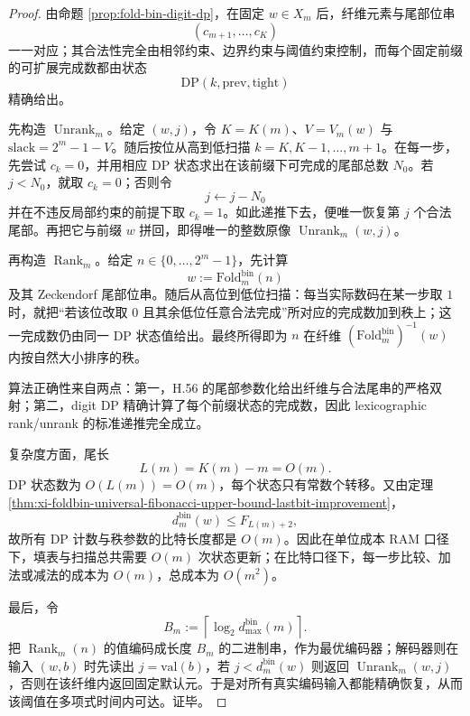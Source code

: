 \begin{proof}
由命题 \ref{prop:fold-bin-digit-dp}，在固定 \(w\in X_m\) 后，纤维元素与尾部位串
\[
(c_{m+1},\dots,c_K)
\]
一一对应；其合法性完全由相邻约束、边界约束与阈值约束控制，而每个固定前缀的可扩展完成数都由状态
\[
\mathrm{DP}(k,\mathrm{prev},\mathrm{tight})
\]
精确给出。

先构造 \(\operatorname{Unrank}_m\)。给定 \((w,j)\)，令 \(K=K(m)\)、\(V=V_m(w)\) 与 \(\mathrm{slack}=2^m-1-V\)。随后按位从高到低扫描 \(k=K,K-1,\dots,m+1\)。在每一步，先尝试 \(c_k=0\)，并用相应 DP 状态求出在该前缀下可完成的尾部总数 \(N_0\)。若 \(j<N_0\)，就取 \(c_k=0\)；否则令
\[
j\leftarrow j-N_0
\]
并在不违反局部约束的前提下取 \(c_k=1\)。如此递推下去，便唯一恢复第 \(j\) 个合法尾部。再把它与前缀 \(w\) 拼回，即得唯一的整数原像 \(\operatorname{Unrank}_m(w,j)\)。

再构造 \(\operatorname{Rank}_m\)。给定 \(n\in\{0,\dots,2^m-1\}\)，先计算
\[
w:=\mathrm{Fold}^{\mathrm{bin}}_m(n)
\]
及其 Zeckendorf 尾部位串。随后从高位到低位扫描：每当实际数码在某一步取 \(1\) 时，就把“若该位改取 \(0\) 且其余低位任意合法完成”所对应的完成数加到秩上；这一完成数仍由同一 DP 状态值给出。最终所得即为 \(n\) 在纤维 \((\mathrm{Fold}^{\mathrm{bin}}_m)^{-1}(w)\) 内按自然大小排序的秩。

算法正确性来自两点：第一，H.56 的尾部参数化给出纤维与合法尾串的严格双射；第二，digit DP 精确计算了每个前缀状态的完成数，因此 lexicographic rank/unrank 的标准递推完全成立。

复杂度方面，尾长
\[
L(m)=K(m)-m=O(m).
\]
DP 状态数为 \(O(L(m))=O(m)\)，每个状态只有常数个转移。又由定理 \ref{thm:xi-foldbin-universal-fibonacci-upper-bound-lastbit-improvement}，
\[
d_m^{\mathrm{bin}}(w)\le F_{L(m)+2},
\]
故所有 DP 计数与秩参数的比特长度都是 \(O(m)\)。因此在单位成本 RAM 口径下，填表与扫描总共需要 \(O(m)\) 次状态更新；在比特口径下，每一步比较、加法或减法的成本为 \(O(m)\)，总成本为 \(O(m^2)\)。

最后，令
\[
B_m:=\left\lceil \log_2 d_{\max}^{\mathrm{bin}}(m)\right\rceil.
\]
把 \(\operatorname{Rank}_m(n)\) 的值编码成长度 \(B_m\) 的二进制串，作为最优编码器；解码器则在输入 \((w,b)\) 时先读出 \(j=\mathrm{val}(b)\)，若 \(j<d_m^{\mathrm{bin}}(w)\) 则返回 \(\operatorname{Unrank}_m(w,j)\)，否则在该纤维内返回固定默认元。于是对所有真实编码输入都能精确恢复，从而该阈值在多项式时间内可达。证毕。
\end{proof}

\endinput
